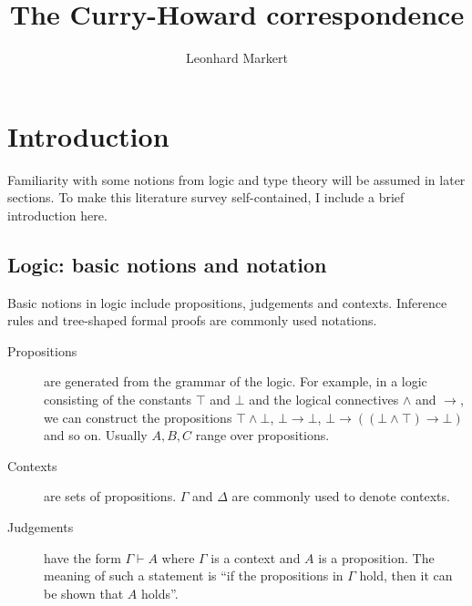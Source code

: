 \documentclass[12pt,toc=bibliography,numbers=noendperiod,
               footnotes=multiple,twoside]{scrartcl}
\title{The Curry-Howard correspondence}
\author{Leonhard Markert}
\date{}
\begin{document}
\maketitle


\makeatletter
{}
\makeatother
\newpage

\section{Introduction}

Familiarity with some notions from logic and type theory will be assumed in later sections. To make this literature survey self-contained, I include a brief introduction here.

\subsection{Logic: basic notions and notation}

Basic notions in logic include propositions, judgements and contexts. Inference rules and tree-shaped formal proofs are commonly used notations.

\begin{description}
\item[Propositions] are generated from the grammar of the logic. For example, in a logic consisting of the constants \(\top\) and \(\bot\) and the logical connectives \(\wedge\) and \(\rightarrow\), we can construct the propositions \(\top \wedge \bot\), \(\bot \rightarrow \bot\), \(\bot \rightarrow ((\bot \wedge \top) \rightarrow \bot)\) and so on. Usually \(A, B, C\) range over propositions.
\item[Contexts] are sets of propositions. \(\Gamma\) and \(\Delta\) are commonly used to denote contexts.
\item[Judgements] have the form \(\Gamma \vdash A\) where \(\Gamma\) is a context and \(A\) is a proposition. The meaning of such a statement is \enquote{if the propositions in \(\Gamma\) hold, then it can be shown that \(A\) holds}.
\end{description}
\end{document}

